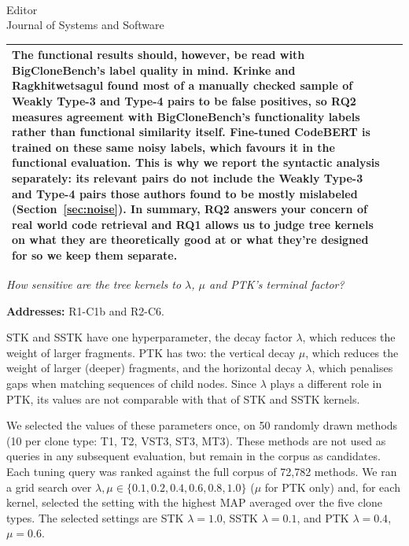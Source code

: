 \documentclass[
pagenumber=false, %
parskip=half, %
fromalign=right, %
foldmarks=false, %
addrfield=false %
]{scrlttr2}
\newcounter{rqsec}\renewcommand{\therqsec}{\Alph{rqsec}}
\newcommand{\rqsection}[2]{\clearpage\refstepcounter{rqsec}{\large\textbf{\therqsec.~#1}}\par\noindent\emph{#2}\par\medskip}
\newcommand{\addresses}[1]{\noindent\textbf{Addresses:} #1\par\medskip}
\begin{document}
\begin{letter}{\\Editor\\Journal of Systems and Software}
\begin{longtable}{p{}p{}}
		The functional results should, however, be read with BigCloneBench's label quality in mind. Krinke
		and Ragkhitwetsagul found most of a manually checked sample of Weakly Type-3 and Type-4 pairs to be
		false positives, so RQ2 measures agreement with BigCloneBench's
		functionality labels rather than functional similarity itself. Fine-tuned CodeBERT is trained on
		these same noisy labels, which favours it in the functional evaluation. This is why we report the syntactic
		analysis separately: its relevant pairs do not include the Weakly Type-3 and Type-4 pairs those authors found to be mostly mislabeled (Section~\ref{sec:noise}).	
		In summary, RQ2 answers your concern of real world code retrieval and RQ1 allows us to judge tree kernels on what they are theoretically good at or what they're designed for so we keep them separate. 
		
		
		\\ \midrule
		
	 	
	 	
	 	
			
	\end{longtable}
		


\rqsection{Kernel hyper-parameters}{How sensitive are the tree kernels to $\lambda$, $\mu$ and PTK's terminal factor?}\label{sec:tuning}
\addresses{R1-C1b and R2-C6.}
\label{sec:R1C1R2C6}

STK and SSTK have one hyperparameter, the decay factor $\lambda$, which reduces the weight of larger
fragments. PTK has two: the vertical decay $\mu$, which reduces the weight of larger (deeper)
fragments, and the horizontal decay $\lambda$, which penalises gaps when matching sequences of child
nodes. Since $\lambda$ plays a different role in PTK, its values are not comparable with that of STK and SSTK kernels.

We selected the values of these parameters once, on 50 randomly drawn methods (10 per clone type: T1, T2, VST3, ST3,
MT3). These methods are not used as queries in any subsequent evaluation, but remain in the corpus as candidates.
Each tuning query was ranked against the full corpus of 72,782 methods. We ran a grid search over
$\lambda, \mu \in \{0.1, 0.2, 0.4, 0.6, 0.8, 1.0\}$ ($\mu$ for PTK only) and, for each kernel, selected
the setting with the highest MAP averaged over the five clone types. The selected settings are
STK $\lambda = 1.0$, SSTK $\lambda = 0.1$, and PTK $\lambda = 0.4$, $\mu = 0.6$.



\end{letter}
\end{document}
